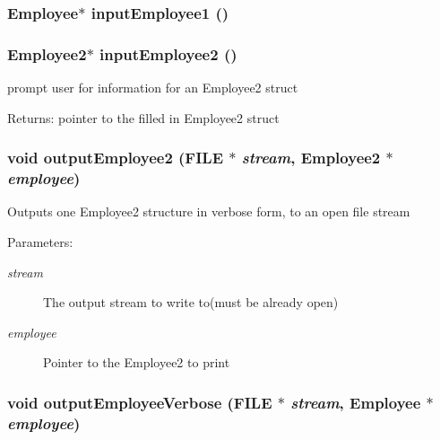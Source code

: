 \subsubsection{\setlength{\rightskip}{0pt plus 5cm}\bf{Employee}$\ast$ input\-Employee1 ()}\label{etest_8h_2f7eec820e865cb745257dbd21a89a0a}


\subsubsection{\setlength{\rightskip}{0pt plus 5cm}\bf{Employee2}$\ast$ input\-Employee2 ()}\label{etest_8h_4bbd1151cc7051aa5bf412b4b7a75c85}


prompt user for information for an Employee2 struct \begin{Desc}
\item[Returns:]pointer to the filled in Employee2 struct \end{Desc}
\subsubsection{\setlength{\rightskip}{0pt plus 5cm}void output\-Employee2 (FILE $\ast$ {\em stream}, \bf{Employee2} $\ast$ {\em employee})}\label{etest_8h_b0fbf8b9edeb553d0ae83d43f5540a14}


Outputs one Employee2 structure in verbose form, to an open file stream \begin{Desc}
\item[Parameters:]
\begin{description}
\item[{\em stream}]The output stream to write to(must be already open) \item[{\em employee}]Pointer to the Employee2 to print \end{description}
\end{Desc}
\subsubsection{\setlength{\rightskip}{0pt plus 5cm}void output\-Employee\-Verbose (FILE $\ast$ {\em stream}, \bf{Employee} $\ast$ {\em employee})}\label{etest_8h_724c7914065fffbb2da47f446b1227ea}


